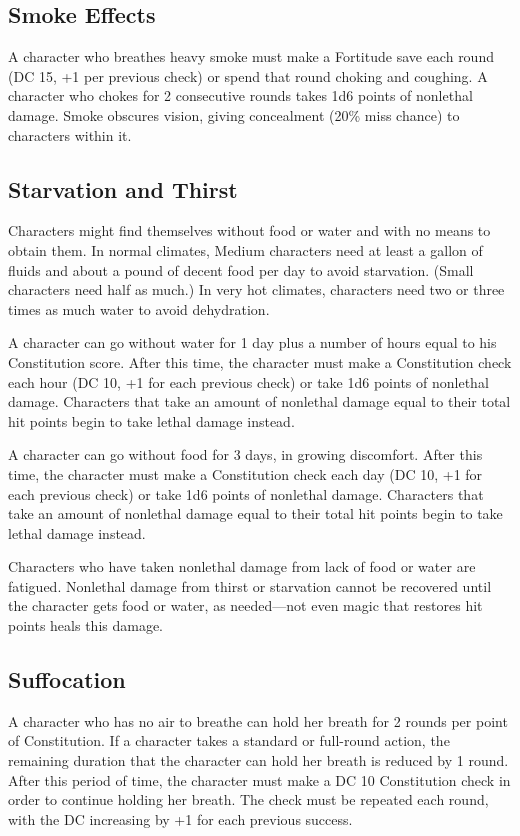 \subsection{Smoke Effects}

				
A character who breathes heavy smoke must make a Fortitude save each round (DC 15, +1 per previous check) or spend that round choking and coughing. A character who chokes for 2 consecutive rounds takes 1d6 points of nonlethal damage. Smoke obscures vision, giving concealment (20\% miss chance) to characters within it.
				
\subsection{Starvation and Thirst}

				
Characters might find themselves without food or water and with no means to obtain them. In normal climates, Medium characters need at least a gallon of fluids and about a pound of decent food per day to avoid starvation. (Small characters need half as much.) In very hot climates, characters need two or three times as much water to avoid dehydration.
				
A character can go without water for 1 day plus a number of hours equal to his Constitution score. After this time, the character must make a Constitution check each hour (DC 10, +1 for each previous check) or take 1d6 points of nonlethal damage. Characters that take an amount of nonlethal damage equal to their total hit points begin to take lethal damage instead.
				
A character can go without food for 3 days, in growing discomfort. After this time, the character must make a Constitution check each day (DC 10, +1 for each previous check) or take 1d6 points of nonlethal damage. Characters that take an amount of nonlethal damage equal to their total hit points begin to take lethal damage instead.
				
Characters who have taken nonlethal damage from lack of food or water are fatigued. Nonlethal damage from thirst or starvation cannot be recovered until the character gets food or water, as needed---not even magic that restores hit points heals this damage.
				
\subsection{Suffocation}

				
A character who has no air to breathe can hold her breath for 2 rounds per point of Constitution. If a character takes a standard or full-round action, the remaining duration that the character can hold her breath is reduced by 1 round. After this period of time, the character must make a DC 10 Constitution check in order to continue holding her breath. The check must be repeated each round, with the DC increasing by +1 for each previous success.
				
